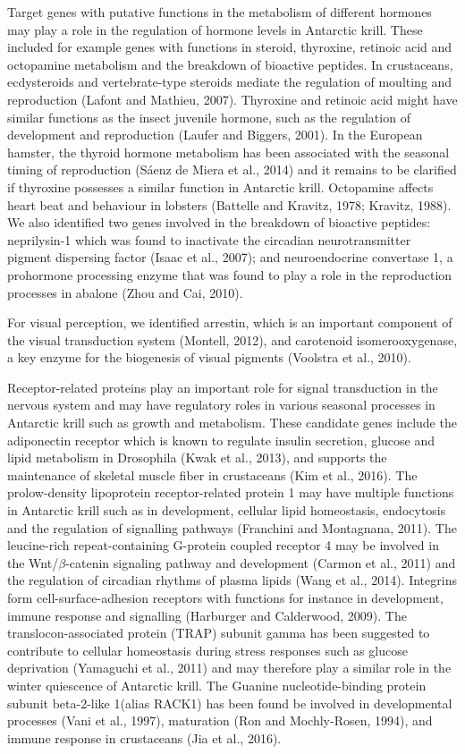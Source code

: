 Target genes with putative functions in the metabolism of different hormones
may play a role in the regulation of hormone levels in Antarctic krill. These
included for example genes with functions in steroid, thyroxine, retinoic acid
and octopamine metabolism and the breakdown of bioactive peptides. In
crustaceans, ecdysteroids and vertebrate-type steroids mediate the regulation
of moulting and reproduction (Lafont and Mathieu, 2007). Thyroxine and retinoic
acid might have similar functions as the insect juvenile hormone, such as the
regulation of development and reproduction (Laufer and Biggers, 2001). In the
European hamster, the thyroid hormone metabolism has been associated with the
seasonal timing of reproduction (Sáenz de Miera et al., 2014) and it remains to
be clarified if thyroxine possesses a similar function in Antarctic krill.
Octopamine affects heart beat and behaviour in lobsters (Battelle and Kravitz,
1978; Kravitz, 1988). We also identified two genes involved in the breakdown of
bioactive peptides: neprilysin-1 which was found to inactivate the circadian
neurotransmitter pigment dispersing factor (Isaac et al., 2007); and
neuroendocrine convertase 1, a prohormone processing enzyme that was found to
play a role in the reproduction processes in abalone (Zhou and Cai, 2010).  

For visual perception, we identified arrestin, which is an important component
of the visual transduction system (Montell, 2012), and carotenoid
isomerooxygenase, a key enzyme for the biogenesis of visual pigments (Voolstra
et al., 2010).

Receptor-related proteins play an important role for signal transduction in the
nervous system and may have regulatory roles in various seasonal processes in
Antarctic krill such as growth and metabolism. These candidate genes include
the adiponectin receptor which is known to regulate insulin secretion, glucose
and lipid metabolism in Drosophila (Kwak et al., 2013), and supports the
maintenance of skeletal muscle fiber in crustaceans (Kim et al., 2016). The
prolow-density lipoprotein receptor-related protein 1 may have multiple
functions in Antarctic krill such as in development, cellular lipid
homeostasis, endocytosis and the regulation of signalling pathways (Franchini
and Montagnana, 2011). The leucine-rich repeat-containing G-protein coupled
receptor 4 may be involved in the Wnt/$\beta$-catenin signaling pathway and
development (Carmon et al., 2011) and the regulation of circadian rhythms of
plasma lipids (Wang et al., 2014). Integrins form cell-surface-adhesion
receptors with functions for instance in development, immune response and
signalling (Harburger and Calderwood, 2009). The translocon-associated protein
(TRAP) subunit gamma has been suggested to contribute to cellular homeostasis
during stress responses such as glucose deprivation (Yamaguchi et al., 2011)
and may therefore play a similar role in the winter quiescence of Antarctic
krill. The Guanine nucleotide-binding protein subunit beta-2-like 1(alias
RACK1) has been found be involved in developmental processes (Vani et al.,
1997), maturation (Ron and Mochly-Rosen, 1994), and immune response in
crustaceans (Jia et al., 2016).

